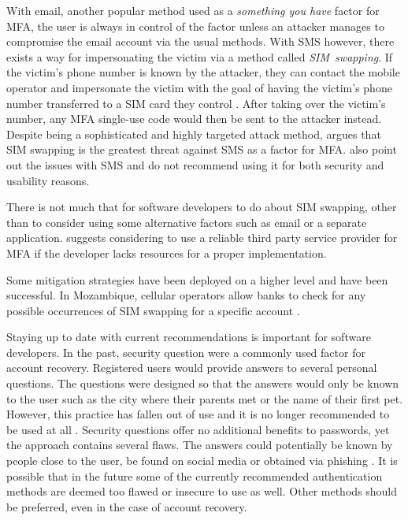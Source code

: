 With email, another popular method used as a \textit{something you have} factor for MFA, the user is always in control of the factor unless an attacker manages to compromise the email account via the usual methods. With SMS however, there exists a way for impersonating the victim via a method called \textit{SIM~swapping}. If the victim's phone number is known by the attacker, they can contact the mobile operator and impersonate the victim with the goal of having the victim's phone number transferred to a SIM card they control \citep{jover_security_2020}. After taking over the victim's number, any MFA single-use code would then be sent to the attacker instead. Despite being a sophisticated and highly targeted attack method, \textcite[16]{jover_security_2020} argues that SIM swapping is the greatest threat against SMS as a factor for MFA. \textcite[208]{karim_choosing_2024} also point out the issues with SMS and do not recommend using it for both security and usability reasons.

There is not much that for software developers to do about SIM swapping, other than to consider using some alternative factors such as email or a separate application. \textcite{owasp_multifactor_2024} suggests considering to use a reliable third party service provider for MFA if the developer lacks resources for a proper implementation.

Some mitigation strategies have been deployed on a higher level and have been successful. In Mozambique, cellular operators allow banks to check for any possible occurrences of SIM swapping for a specific account \citep[17--18]{jover_security_2020}.

Staying up to date with current recommendations is important for software developers. In the past, security question were a commonly used factor for account recovery. Registered users would provide answers to several personal questions. The questions were designed so that the answers would only be known to the user such as the city where their parents met or the name of their first pet. However, this practice has fallen out of use and it is no longer recommended to be used at all \citep{owasp_multifactor_2024} \citep{grassi_digital_2017}. Security questions offer no additional benefits to passwords, yet the approach contains several flaws. The answers could potentially be known by people close to the user, be found on social media or obtained via phishing \citep{owasp_multifactor_2024}. It is possible that in the future some of the currently recommended authentication methods are deemed too flawed or insecure to use as well. Other methods should be preferred, even in the case of account recovery.

